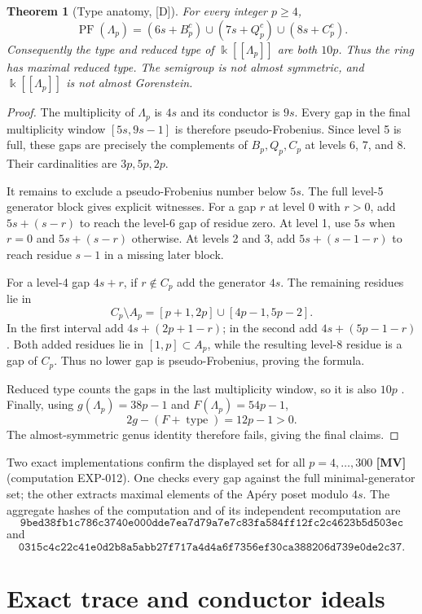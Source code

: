 \documentclass[11pt]{article}
\newtheorem{theorem}{Theorem}[section]
\theoremstyle{definition}
\theoremstyle{remark}
\newcommand{\kfield}{\Bbbk}
\begin{document}
\begin{theorem}[Type anatomy, {[D]}]\label{thm:type}
For every integer $p\ge4$,
\[
\operatorname{PF}(\Lambda_p)
=(6s+B_p^c)\cup(7s+Q_p^c)\cup(8s+C_p^c).
\]
Consequently the type and reduced type of $\kfield[[\Lambda_p]]$ are both $10p$. Thus the ring has
maximal reduced type. The semigroup is not almost symmetric, and $\kfield[[\Lambda_p]]$ is not
almost Gorenstein.
\end{theorem}
\begin{proof}
The multiplicity of $\Lambda_p$ is $4s$ and its conductor is $9s$. Every gap in the final
multiplicity window $[5s,9s-1]$ is therefore pseudo-Frobenius. Since level 5 is full, these gaps
are precisely the complements of $B_p,Q_p,C_p$ at levels 6, 7, and 8. Their cardinalities are
$3p,5p,2p$.

It remains to exclude a pseudo-Frobenius number below $5s$. The full level-5 generator block gives
explicit witnesses. For a gap $r$ at level 0 with $r>0$, add $5s+(s-r)$ to reach the level-6 gap
of residue zero. At level 1, use $5s$ when $r=0$ and $5s+(s-r)$ otherwise. At levels 2 and 3,
add $5s+(s-1-r)$ to reach residue $s-1$ in a missing later block.

For a level-4 gap $4s+r$, if $r\notin C_p$ add the generator $4s$. The remaining residues lie in
\[
C_p\setminus A_p=[p+1,2p]\cup[4p-1,5p-2].
\]
In the first interval add $4s+(2p+1-r)$; in the second add $4s+(5p-1-r)$. Both added residues lie
in $[1,p]\subset A_p$, while the resulting level-8 residue is a gap of $C_p$. Thus no lower gap
is pseudo-Frobenius, proving the formula.

Reduced type counts the gaps in the last multiplicity window, so it is also $10p$
\cite{MaitraMukundan2023}. Finally, using $g(\Lambda_p)=38p-1$ and $F(\Lambda_p)=54p-1$,
\[
2g-(F+\operatorname{type})=12p-1>0.
\]
The almost-symmetric genus identity therefore fails, giving the final claims.
\end{proof}

Two exact implementations confirm the displayed set for all $p=4,\ldots,300$ \textbf{[MV]}
(computation EXP-012). One checks every gap against the full minimal-generator set; the other
extracts maximal elements of the Ap\'ery poset modulo $4s$. The aggregate hashes of the
computation and of its independent recomputation are
\[
\texttt{9bed38fb1c786c3740e000dde7ea7d79a7e7c83fa584ff12fc2c4623b5d503ec}
\]
and
\[
\texttt{0315c4c22c41e0d2b8a5abb27f717a4d4a6f7356ef30ca388206d739e0de2c37}.
\]

\section{Exact trace and conductor ideals}
\end{document}

